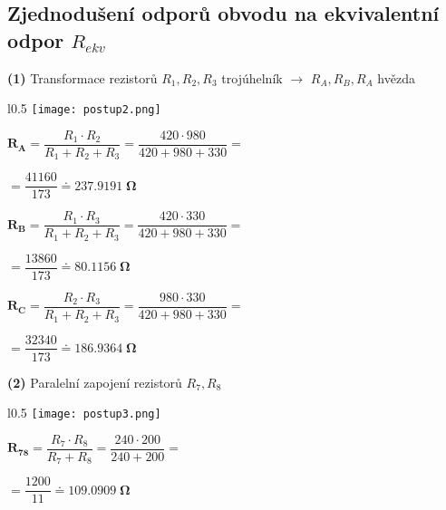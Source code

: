 \documentclass[a4paper,12pt]{article}
\begin{document}
\subsection{Zjednodušení odporů obvodu na ekvivalentní odpor $R_{ekv}$}\par
\hspace{1em}\textbf{(1)} Transformace rezistorů $R_1, R_2, R_3$ trojúhelník $\rightarrow$ $R_A, R_B, R_A$ hvězda\par
\begin{wrapfigure}{l}{0.5\textwidth}
\vspace{-5pt}
\texttt{[image: postup2.png]}
\vspace{-105pt}
\end{wrapfigure}
\vspace{10pt}\hspace{1em}$\mathbf{R_A}=\dfrac{R_1\cdot R_2}{R_1+R_2+R_3}=\dfrac{420\cdot 980}{420+980+330}=$\par\hspace{1em}$=\dfrac{41160}{173}\doteq \mathbf{ 237.9191 \;\si{\Omega}}$\par\hspace{1em}$\mathbf{R_B}=\dfrac{R_1\cdot R_3}{R_1+R_2+R_3}=\dfrac{420\cdot 330}{420+980+330}=$\par\hspace{1em}$=\dfrac{13860}{173}\doteq \mathbf{ 80.1156 \;\si{\Omega}}$\par\hspace{1em}$\mathbf{R_C}=\dfrac{R_2\cdot R_3}{R_1+R_2+R_3}=\dfrac{980\cdot 330}{420+980+330}=$\par\hspace{1em}$=\dfrac{32340}{173}\doteq \mathbf{ 186.9364 \;\si{\Omega}}$\par\vspace{1.5em}
\hspace{1em}\textbf{(2)} Paralelní zapojení rezistorů $R_7, R_8$\par
\begin{wrapfigure}{l}{0.5\textwidth}
\vspace{-47pt}
\texttt{[image: postup3.png]}
\vspace{-75pt}
\end{wrapfigure}
\vspace{28pt}\hspace{1em}
$\mathbf{R_{78}}=\dfrac{R_7\cdot R_8}{R_7+R_8}=\dfrac{240\cdot 200}{240+200}=$\par\hspace{1em}$=\dfrac{1200}{11}\doteq \mathbf{ 109.0909 \;\si{\Omega}}$\newpage
\end{document}
